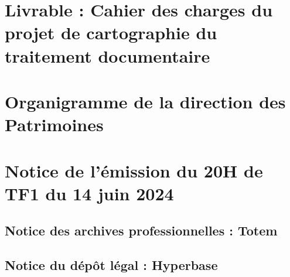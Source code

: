 \documentclass[12pt,twoside, openany]{book} %
\begin{document}
	 
	
	\chapter{Livrable : Cahier des charges du projet de cartographie du traitement documentaire}
	\label{ann:cdc}
	
	
	
	\chapter{Organigramme de la direction des Patrimoines}
	\label{ann:org}
	
	
	
	\chapter{Notice de l'émission du 20H de TF1 du 14 juin 2024}
	\label{ann:notices}
	
		\section{Notice des archives professionnelles : Totem}
		
			
		
		\section{Notice du dépôt légal : Hyperbase}
		
			
	
	\let\addcontentsline\oldaddcontentsline

\newpage{\pagestyle{empty}\cleardoublepage}


\backmatter %

\printglossaries
\tableofcontents
\end{document}
